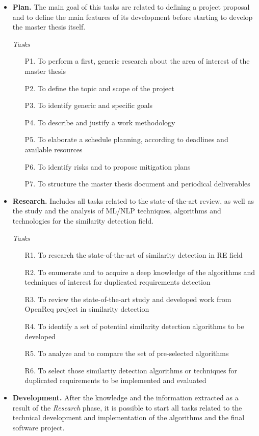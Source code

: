 \documentclass[11pt]{article}
\begin{document}
\begin{itemize}
\item \textbf{Plan.} The main goal of this tasks are related to defining a project proposal and to define the main features of its development before starting to develop the master thesis itself.

\textit{Tasks}
\begin{enumerate}
\item[P1.] To perform a first, generic research about the area of interest of the master thesis
\item[P2.] To define the topic and scope of the project
\item[P3.] To identify generic and specific goals
\item[P4.] To describe and justify a work methodology
\item[P5.] To elaborate a schedule planning, according to deadlines and available resources
\item[P6.] To identify risks and to propose mitigation plans
\item[P7.] To structure the master thesis document and periodical deliverables
\end{enumerate}
\item \textbf{Research.} Includes all tasks related to the state-of-the-art review, as well as the study and the analysis of ML/NLP techniques, algorithms and technologies for the similarity detection field.

\textit{Tasks}
\begin{enumerate}
\item[R1.] To research the state-of-the-art of similarity detection in RE field
\item[R2.] To enumerate and to acquire a deep knowledge of the algorithms and techniques of interest for duplicated requirements detection
\item[R3.] To review the state-of-the-art study and developed work from OpenReq project in similarity detection
\item[R4.] To identify a set of potential similarity detection algorithms to be developed 
\item[R5.] To analyze and to compare the set of pre-selected algorithms
\item[R6.] To select those similartiy detection algorithms or techniques for duplicated requirements to be implemented and evaluated
\end{enumerate}
\item \textbf{Development.} After the knowledge and the information extracted as a result of the \textit{Research} phase, it is possible to start all tasks related to the technical development and implementation of the algorithms and the final software project.


\end{itemize}
\end{document}
